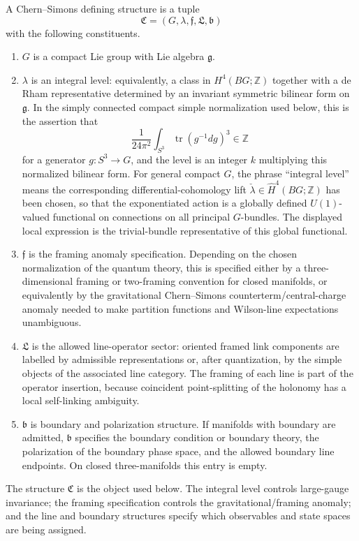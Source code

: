 \begin{definition}
\label{def:chern-simons-defining-datum}
A Chern--Simons defining structure is a tuple
\[
  \mathfrak C=(G,\lambda,\mathfrak f,\mathfrak L,\mathfrak b)
\]
with the following constituents.
\begin{enumerate}[label=\textup{(\roman*)}]
\item \(G\) is a compact Lie group with Lie algebra \(\mathfrak g\).
\item \(\lambda\) is an integral level: equivalently, a class in
\(H^4(BG;\mathbb Z)\) together with a de Rham representative determined by an
invariant symmetric bilinear form on \(\mathfrak g\).  In the simply connected
compact simple normalization used below, this is the assertion that
\[
  \frac{1}{24\pi^2}\int_{S^3}
  \operatorname{tr}(g^{-1}dg)^3\in\mathbb Z
\]
for a generator \(g:S^3\to G\), and the level is an integer \(k\) multiplying
this normalized bilinear form.  For general compact \(G\), the phrase
``integral level'' means the corresponding differential-cohomology lift
\(\check\lambda\in\widehat H^4(BG;\mathbb Z)\) has been chosen, so that the
exponentiated action is a globally defined \(U(1)\)-valued functional on
connections on all principal \(G\)-bundles.  The displayed local expression is
the trivial-bundle representative of this global functional.
\item \(\mathfrak f\) is the framing anomaly specification.  Depending on the chosen
normalization of the quantum theory, this is specified either by a
three-dimensional framing or two-framing convention for closed manifolds, or
equivalently by the gravitational Chern--Simons counterterm/central-charge
anomaly needed to make partition functions and Wilson-line expectations
unambiguous.
\item \(\mathfrak L\) is the allowed line-operator sector: oriented framed link
components are labelled by admissible representations or, after quantization,
by the simple objects of the associated line category.  The framing of each
line is part of the operator insertion, because coincident point-splitting of
the holonomy has a local self-linking ambiguity.
\item \(\mathfrak b\) is boundary and polarization structure.  If manifolds with
boundary are admitted, \(\mathfrak b\) specifies the boundary condition or
boundary theory, the polarization of the boundary phase space, and the
allowed boundary line endpoints.  On closed three-manifolds this entry is
empty.
\end{enumerate}
The structure \(\mathfrak C\) is the object used below.  The integral level
controls large-gauge invariance; the framing specification controls the
gravitational/framing anomaly; and the line and boundary structures specify
which observables and state spaces are being assigned.
\end{definition}

